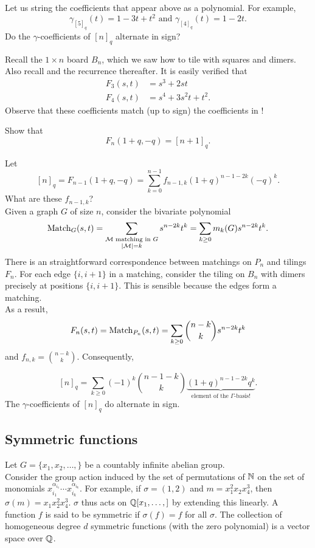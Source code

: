 	Let us string the coefficients that appear above as a polynomial. For example,
	\begin{equation}
		\label{eqn: gamma example}
		\gamma_{[5]_q}(t) = 1-3t+t^2 \text{ and } \gamma_{[4]_q}(t) = 1-2t.
	\end{equation}
	Do the $\gamma$-coefficients of $[n]_q$ alternate in sign?

	Recall the $1 \times n$ board $B_n$, which we saw how to tile with squares and dimers. Also recall  and the recurrence thereafter. It is easily verified that
	\begin{align*}
		F_3(s,t) &= s^3 + 2st \\
		F_4(s,t) &= s^4 + 3s^2t + t^2.
	\end{align*}
	Observe that these coefficients match (up to sign) the coefficients in !

	\begin{exercise}
		Show that
		\[ F_n(1+q,-q) = [n+1]_q. \]
	\end{exercise}

	Let
	\[ [n]_q = F_{n-1}(1+q,-q) = \sum_{k = 0}^{n-1} f_{n-1,k} (1+q)^{n-1-2k}(-q)^k. \]
	What are these $f_{n-1,k}$?\\

	Given a graph $G$ of size $n$, consider the bivariate polynomial
	\[ \operatorname{Match}_G(s,t) = \sum_{\substack{\text{$\mathcal{M}$ matching in $G$} \\ |\mathcal{M}| = k}} s^{n-2k} t^k = \sum_{k \ge 0} m_k(G) s^{n-2k} t^k . \]
	There is an straightforward correspondence between matchings on $P_n$ and tilings $F_n$. For each edge $\{i,i+1\}$ in a matching, consider the tiling on $B_n$ with dimers precisely at positions $\{i,i+1\}$. This is sensible because the edges form a matching.\\
	As a result,
	\[ F_n(s,t) = \operatorname{Match}_{P_n}(s,t) = \sum_{k \ge 0} \binom{n-k}{k} s^{n-2k} t^k \]
	and $f_{n,k} = \binom{n-k}{k}$. Consequently,

	\[ [n]_q = \sum_{k \ge 0} (-1)^k \binom{n-1-k}{k} \underbrace{(1+q)^{n-1-2k} q^k}_{\text{element of the $\Gamma$-basis!}}. \]
	The $\gamma$-coefficients of $[n]_q$ do alternate in sign.

\subsection{Symmetric functions}

	Let $G = \{x_1,x_2,\ldots,\}$ be a countably infinite abelian group.\\ 
	Consider the group action induced by the set of permutations of $\mathbb{N}$ on the set of monomials $x_{i_1}^{\alpha_{i_1}}\cdots x_{i_k}^{\alpha_{i_k}}$. For example,
	if $\sigma = (1,2)$ and $m = x_1^2x_2x_4^3$, then $\sigma(m) = x_1x_2^2x_4^3$.
	$\sigma$ thus acts on $\mathbb{Q}[x_1,\ldots,]$ by extending this linearly. A function $f$ is said to be symmetric if $\sigma(f) = f$ for all $\sigma$. The collection of homogeneous degree $d$ symmetric functions (with the zero polynomial) is a vector space over $\mathbb{Q}$.\\

